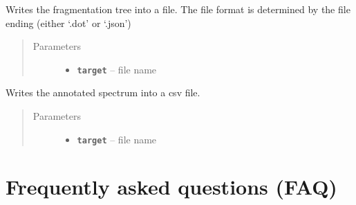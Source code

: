 \documentclass[letterpaper,10pt,openany,oneside]{sphinxmanual}
\begin{document}
\begin{fulllineitems}
\label{library:de.unijena.bioinf.sirius.writeTreeToFile(File)}
Writes the fragmentation tree into a file. The file format is determined by the file ending (either `.dot' or `.json')
\begin{quote}\begin{description}
\item[{Parameters}] \leavevmode\begin{itemize}
\item {} 
\textbf{\texttt{target}} -- file name

\end{itemize}

\end{description}\end{quote}

\end{fulllineitems}


\begin{fulllineitems}
\label{library:de.unijena.bioinf.sirius.writeAnnotatedSpectrumToFile(File)}
Writes the annotated spectrum into a csv file.
\begin{quote}\begin{description}
\item[{Parameters}] \leavevmode\begin{itemize}
\item {} 
\textbf{\texttt{target}} -- file name

\end{itemize}

\end{description}\end{quote}

\end{fulllineitems}

\newpage
\chapter{Frequently asked questions (FAQ)}

\end{document}
